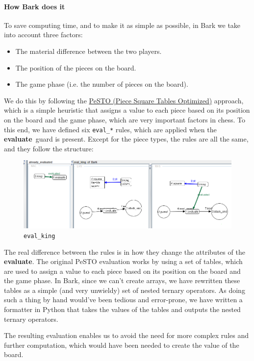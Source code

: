 \documentclass[a4paper, 10pt]{scrartcl}
\newcommand{\noderepr}[1]{\textsf{\textbf{#1}}}
\newcommand{\evaluate}{\noderepr{evaluate}}
\begin{document}
    \paragraph{How Bark does it} To save computing time, and to make it as simple as possible, in Bark we take into account three factors:
    \begin{itemize}
        \item The material difference between the two players.
        \item The position of the pieces on the board.
        \item The game phase (i.e. the number of pieces on the board).
    \end{itemize}
    We do this by following the \href{https://www.chessprogramming.org/PeSTO%27s_Evaluation_Function}{PeSTO (Piece Square Tables Optimized)} approach, which is a simple heuristic that assigns a value to each piece based on its position on the board and the game phase, which are very important factors in chess.
    To this end, we have defined six \texttt{eval\_*} rules, which are applied when the \evaluate\ guard is present. Except for the piece types, the rules are all the same, and they follow the structure:
    \begin{figure}[H]
        \centering
        \includegraphics[width=.8\linewidth]{images/eval_king.png}
        \caption{\texttt{eval\_king}}
    \end{figure}
    The real difference between the rules is in how they change the attributes of the \evaluate. The original PeSTO evaluation works by using a set of tables, which are used to assign a value to each piece based on its position on the board and the game phase. In Bark, since we can't create arrays, we have rewritten these tables as a simple (and very unwieldy) set of nested ternary operators. As doing such a thing by hand would've been tedious and error-prone, we have written a formatter in Python that takes the values of the tables and outputs the nested ternary operators.

    The resulting evaluation enables us to avoid the need for more complex rules and further computation, which would have been needed to create the value of the board.
\end{document}
